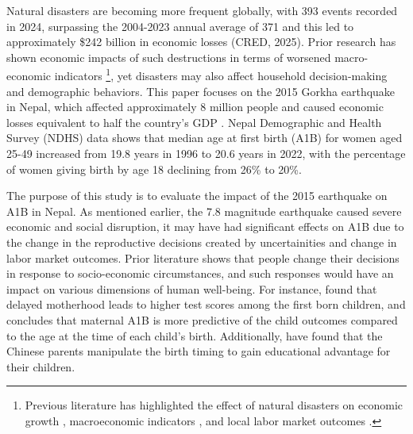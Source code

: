 \documentclass[11pt,a4paper]{article}
\begin{document}
Natural disasters are becoming more frequent globally, with 393 events recorded in 2024, surpassing the 2004-2023 annual average of 371 and this led to approximately \$242 billion in economic losses (CRED, 2025). Prior research has shown economic impacts of such destructions in terms of worsened macro-economic indicators \footnote{Previous literature has highlighted the effect of natural disasters on economic growth \citep{cavallo2013catastrophic, fomby2013growth}, macroeconomic indicators \citep{noy2009macroeconomic, horwich2000economic}, and local labor market outcomes \citep{shakya2022natural, belasen2009disasters, kirchberger2017natural, mcintosh2008measuring}.}, yet disasters may also affect household decision-making and demographic behaviors. This paper focuses on the 2015 Gorkha earthquake in Nepal, which affected approximately 8 million people and caused economic losses equivalent to half the country's GDP \citep{goda20152015}. Nepal Demographic and Health Survey (NDHS) data shows that median age at first birth (A1B) for women aged 25-49 increased from 19.8 years in 1996 to 20.6 years in 2022, with the percentage of women giving birth by age 18 declining from 26\% to 20\%.

\vspace{0.25 cm}

The purpose of this study is to evaluate the impact of the 2015
earthquake on A1B in Nepal. As mentioned earlier, the 7.8 magnitude earthquake caused severe economic and social disruption, it may have had significant effects on A1B due to the change in the reproductive decisions created by uncertainities and change in labor market outcomes. Prior literature shows that people change their decisions in response to socio-economic circumstances, and such responses would have an impact on various dimensions of human well-being. For instance, \citet{miller2009motherhood} found that delayed motherhood leads to higher test scores among the first born children, and \citet{lopez2003children} concludes that maternal A1B is more predictive of the child outcomes compared to the age at the time of each child's birth. Additionally, \citet{huang2020early} have found that the Chinese parents manipulate the birth timing to gain educational advantage for their children.

\vspace{0.25cm}
\end{document}
